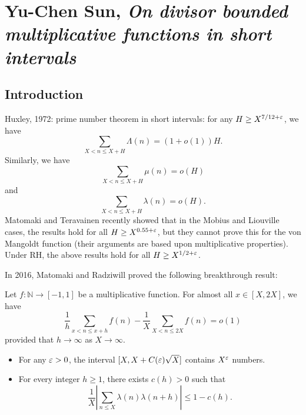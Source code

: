 \documentclass[reqno]{amsart} 
\begin{document}
\section{Yu-Chen Sun, \emph{On divisor bounded multiplicative functions in short intervals}}

\subsection{Introduction}
Huxley, 1972: prime number theorem in short intervals: for any $H \geq X^{7/12 + \varepsilon }$, we have
\begin{equation*}
  \sum_{X < n \leq X + H } \Lambda (n ) = (1 + o(1)) H.
\end{equation*}
Similarly, we have
\begin{equation*}
  \sum_{X < n \leq X + H } \mu (n) = o(H)
\end{equation*}
and
\begin{equation*}
  \sum_{X < n \leq X + H } \lambda (n) = o(H).
\end{equation*}
Matomaki and Teravainen recently showed that in the Mobius and Liouville cases, the results hold for all $H \geq X^{0.55 + \varepsilon}$, but they cannot prove this for the von Mangoldt function (their arguments are based upon multiplicative properties).  Under RH, the above results hold for all $H \geq X^{1/2 + \varepsilon}$.

In 2016, Matomaki and Radziwill proved the following breakthrough result:
\begin{theorem}
  Let $f : \mathbb{N} \rightarrow [-1,1]$ be a multiplicative function.  For almost all $x \in [X, 2 X]$, we have
  \begin{equation*}
    \frac{1}{h} \sum_{x < n \leq x + h}
    f (n)
    - \frac{1}{X}
    \sum_{X < n \leq 2 X} f (n)
    = o(1)
  \end{equation*}
  provided that $h \rightarrow \infty $ as $X \rightarrow \infty $.
\end{theorem}
\begin{itemize}
\item For any $\varepsilon > 0$, the interval $[X, X + C (\varepsilon ) \sqrt{X }] $ contains $X^\varepsilon $ numbers.
\item For every integer $h \geq 1$, there exists $c (h ) > 0$ such that
  \begin{equation*}
    \frac{1}{ X}
    \left\lvert
      \sum_{n \leq X } \lambda (n ) \lambda (n + h )
    \right\rvert \leq 1 - c (h).
  \end{equation*}
\end{itemize}
\end{document}
